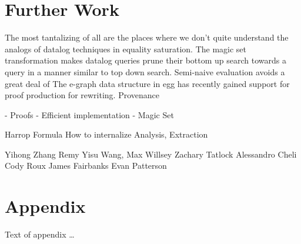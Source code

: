\documentclass[sigplan,10pt,review,anonymous]{acmart}
\begin{document}
\section{Further Work}
The most tantalizing of all are the places where we don't quite understand the analogs of datalog techniques in equality saturation.
The magic set transformation makes datalog queries prune their bottom up search towards a query in a manner similar to top down search.
Semi-naive evaluation avoids a great deal of 
The e-graph data structure in egg has recently gained support for proof production for rewriting. Provenance

- Proofs
- Efficient implementation
- Magic Set

Harrop Formula
How to internalize Analysis, Extraction

\begin{acks}                            %
  Yihong Zhang
Remy Yisu Wang,
Max Willsey
Zachary Tatlock
Alessandro Cheli
Cody Roux
James Fairbanks
Evan Patterson
\end{acks}





\appendix
\section{Appendix}

Text of appendix \ldots
\end{document}
